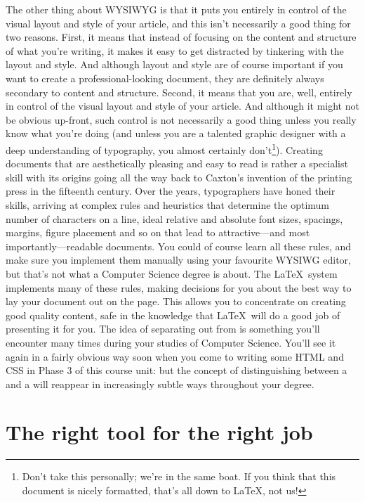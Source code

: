 \begin{refsection}
The other thing about WYSIWYG is that it puts you entirely in control of the visual layout and style of your article, and this isn't necessarily a good thing for two reasons. First, it means that instead of focusing on the content and structure of what you're writing, it makes it easy to get distracted by tinkering with the layout and style. And although layout and style are of course important if you want to create a professional-looking document, they are definitely always secondary to content and structure. Second, it means that you are, well, entirely in control of the visual layout and style of your article. And although it might not be obvious up-front, such control is not necessarily a good thing unless you really know what you're doing (and unless you are a talented graphic designer with a deep understanding of typography, you almost certainly don't\footnote{Don't take this personally; we're in the same boat. If you think that this document is nicely formatted, that's all down to \LaTeX, not us!}). Creating documents that are aesthetically pleasing and easy to read is rather a specialist skill with its origins going all the way back to Caxton's invention of the printing press in the fifteenth century.  Over the years, typographers have honed their skills, arriving at complex rules and heuristics that determine the optimum number of characters on a line, ideal relative and absolute font sizes, spacings, margins, figure placement and so on that lead to attractive---and most importantly---readable documents. You could of course learn all these rules, and make sure you implement them manually using your favourite WYSIWG editor, but that's not what a Computer Science degree is about. The \LaTeX\ system implements many of these rules, making decisions for you about the best way to lay your document out on the page. This allows you to concentrate on creating good quality content, safe in the knowledge that \LaTeX\ will do a good job of presenting it  for you. The idea of separating out  from  is something you'll encounter many times during your studies of Computer Science. You'll see it again in a fairly obvious way soon when you come to writing some HTML and CSS in Phase 3 of this course unit: but the concept of distinguishing between a  and a  will reappear in increasingly subtle ways throughout your degree. 

\section{The right tool for the right job}


\end{refsection}
